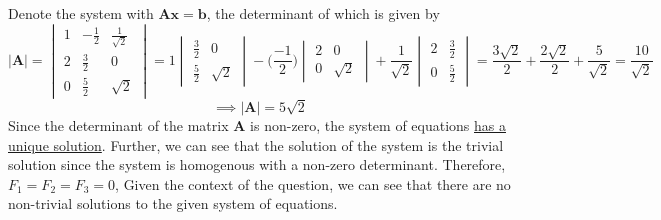 Denote the system with \( \mathbf{A}\mathbf{x} = \mathbf{b} \), the determinant of which is given by
\[
    \left| \mathbf{A} \right| = \begin{vmatrix} 1 & -\frac{1}{2} & \frac{1}{\sqrt{2}} \\ 2 & \frac{3}{2} & 0 \\ 0 & \frac{5}{2} & \sqrt{2} \end{vmatrix}
    = 1 \begin{vmatrix} \frac{3}{2} & 0 \\ \frac{5}{2} & \sqrt{2} \end{vmatrix} - \Big(\frac{-1}{2}\Big) \begin{vmatrix} 2 & 0 \\ 0 & \sqrt{2} \end{vmatrix} + \frac{1}{\sqrt{2}} \begin{vmatrix} 2 & \frac{3}{2} \\ 0 & \frac{5}{2} \end{vmatrix}
    =\frac{3\sqrt{2}}{2} + \frac{2\sqrt{2}}{2} + \frac{5}{\sqrt{2}}
    = \frac{10}{\sqrt{2}}
\]
\[
    \implies \left| \mathbf{A} \right| = 5 \sqrt{2}
\]
Since the determinant of the matrix \( \mathbf{A} \) is non-zero, the system of equations \underline{has a unique solution}.
Further, we can see that the solution of the system is the trivial solution since the system is homogenous with a non-zero determinant.
Therefore, \( F_1 = F_2 = F_3 = 0 \),
Given the context of the question, we can see that there are no non-trivial solutions to the given system of equations.
